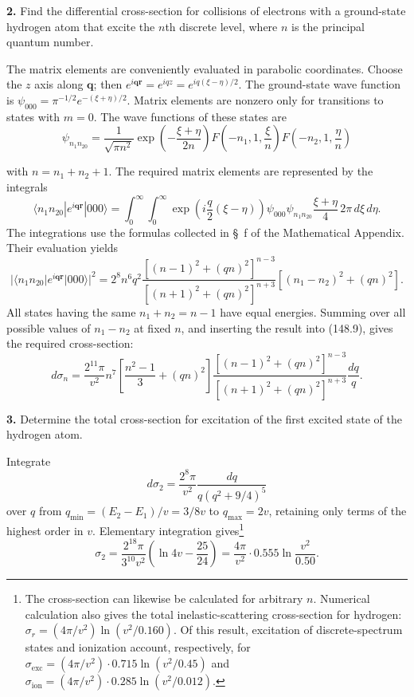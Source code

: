 \noindent\textbf{2.} Find the differential cross-section for collisions of
electrons with a ground-state hydrogen atom that excite the $n$th discrete
level, where $n$ is the principal quantum number.

\SolutionHeading The matrix elements are conveniently evaluated in parabolic
coordinates.  Choose the $z$ axis along $\mathbf q$; then
$e^{i\mathbf q\mathbf r}=e^{iqz}=e^{iq(\xi-\eta)/2}$.  The ground-state wave
function is $\psi_{000}=\pi^{-1/2}e^{-(\xi+\eta)/2}$.  Matrix elements are
nonzero only for transitions to states with $m=0$.  The wave functions of
these states are
\[
 \psi_{n_1n_20}=\frac1{\sqrt{\pi n^2}}\exp\!\left(-\frac{\xi+\eta}{2n}\right)
 F\!\left(-n_1,1,\frac\xi n\right)F\!\left(-n_2,1,\frac\eta n\right)
\]

with $n=n_1+n_2+1$.  The required matrix elements are represented by the
integrals
\[
 \langle n_1n_20|e^{i\mathbf q\mathbf r}|000\rangle=
 \int_0^\infty\!\!\int_0^\infty
 \exp\!\left(i\frac q2(\xi-\eta)\right)\psi_{000}\psi_{n_1n_20}
 \frac{\xi+\eta}{4}\,2\pi\,d\xi\,d\eta.
\]
The integrations use the formulas collected in \S~f of the Mathematical
Appendix.  Their evaluation yields
\[
 |\langle n_1n_20|e^{i\mathbf q\mathbf r}|000\rangle|^2
 =2^8n^6q^2\frac{[(n-1)^2+(qn)^2]^{n-3}}{[(n+1)^2+(qn)^2]^{n+3}}
 [(n_1-n_2)^2+(qn)^2].
\]
All states having the same $n_1+n_2=n-1$ have equal energies.  Summing over
all possible values of $n_1-n_2$ at fixed $n$, and inserting the result into
(148.9), gives the required cross-section:
\[
 d\sigma_n=\frac{2^{11}\pi}{v^2}n^7\left[\frac{n^2-1}{3}+(qn)^2\right]
 \frac{[(n-1)^2+(qn)^2]^{n-3}}{[(n+1)^2+(qn)^2]^{n+3}}\frac{dq}{q}.
\]

\noindent\textbf{3.} Determine the total cross-section for excitation of the
first excited state of the hydrogen atom.

\SolutionHeading Integrate
\[
 d\sigma_2=\frac{2^8\pi}{v^2}\frac{dq}{q(q^2+9/4)^5}
\]
over $q$ from $q_{\min}=(E_2-E_1)/v=3/8v$ to $q_{\max}=2v$, retaining only
terms of the highest order in $v$.  Elementary integration gives\footnote{The
cross-section can likewise be calculated for arbitrary $n$.  Numerical
calculation also gives the total inelastic-scattering cross-section for
hydrogen: $\sigma_r=(4\pi/v^2)\ln(v^2/0.160)$.  Of this result, excitation of
discrete-spectrum states and ionization account, respectively, for
$\sigma_{\text{exc}}=(4\pi/v^2)\cdot0.715\ln(v^2/0.45)$ and
$\sigma_{\text{ion}}=(4\pi/v^2)\cdot0.285\ln(v^2/0.012)$.}
\[
 \sigma_2=\frac{2^{18}\pi}{3^{10}v^2}\left(\ln4v-\frac{25}{24}\right)
 =\frac{4\pi}{v^2}\cdot0.555\ln\frac{v^2}{0.50}.
\]

